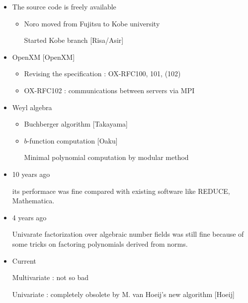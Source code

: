\begin{slide}{}
\begin{itemize}
\item The source code is freely available

\begin{itemize}
\item Noro moved from Fujitsu to Kobe university

Started Kobe branch [Risa/Asir]
\end{itemize}

\item OpenXM [OpenXM]

\begin{itemize}
\item Revising the specification : OX-RFC100, 101, (102)

\item OX-RFC102 : communications between servers via MPI
\end{itemize}

\item Weyl algebra

\begin{itemize}
\item Buchberger algorithm [Takayama]

\item $b$-function computation [Oaku]

Minimal polynomial computation by modular method
\end{itemize}
\end{itemize}

\end{slide}

\begin{slide}{}

\begin{itemize}
\item 10 years ago

its performace was fine compared with existing software
like REDUCE, Mathematica.

\item 4 years ago

Univarate factorization over algebraic number fields was
still fine because of some tricks on factoring polynomials
derived from norms.

\item Current

Multivariate : not so bad

Univariate : completely obsolete by M. van Hoeij's new algorithm
[Hoeij]
\end{itemize}

\end{slide}


